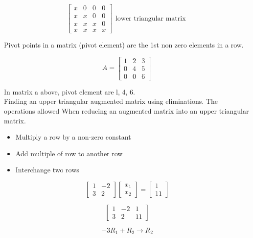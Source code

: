 \documentclass[main.tex]{subfiles}
\begin{document}
    $$
    \left[\begin{array}{llll}
    x & 0 & 0 & 0 \\
    x & x & 0 & 0 \\
    x & x & x & 0 \\
    x & x & x & x
    \end{array}\right] \text { lower triangular matrix }
    $$
    
    Pivot points in a matrix (pivot element) are the 1st non zero elements in a row. 
    
    $$
    A=\left[\begin{array}{lll}
    1 & 2 & 3 \\
    0 & 4 & 5 \\
    0 & 0 & 6
    \end{array}\right]
    $$
    
    In matrix a above, pivot element are l, 4, 6.\\
    
    Finding an upper triangular augmented matrix using eliminations. The operations allowed When reducing an augmented matrix into an upper triangular matrix.
    
    \begin{itemize}
        \item Multiply a row by a non-zero constant
        \item Add multiple of row to another row
        \item Interchange two rows
    \end{itemize} 
    
    $$
    \left[\begin{array}{cc}
    1 & -2 \\
    3 & 2
    \end{array}\right]\left[\begin{array}{l}
    x_{1} \\
    x_{2}
    \end{array}\right]=\left[\begin{array}{c}
    1 \\
    11
    \end{array}\right]
    $$
    
    $$
    \left[\begin{array}{cc|c}
    1 & -2 & 1 \\
    3 & 2 & 11
    \end{array}\right]
    $$
    
    $$
    -3R_{1} + R_{2} \rightarrow R_{2}
    $$
    
\end{document}
